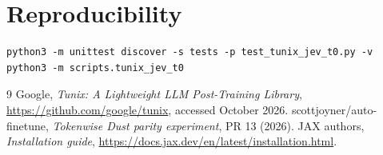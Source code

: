 \documentclass[10pt]{article}
\begin{document}
\section{Reproducibility}
\begin{verbatim}
python3 -m unittest discover -s tests -p test_tunix_jev_t0.py -v
python3 -m scripts.tunix_jev_t0
\end{verbatim}
\begin{thebibliography}{9}
 Google, \emph{Tunix: A Lightweight LLM Post-Training Library},
\url{https://github.com/google/tunix}, accessed October 2026.
 scottjoyner/auto-finetune,
\emph{Tokenwise Dust parity experiment}, PR 13 (2026).
 JAX authors, \emph{Installation guide},
\url{https://docs.jax.dev/en/latest/installation.html}.
\end{thebibliography}
\end{document}
